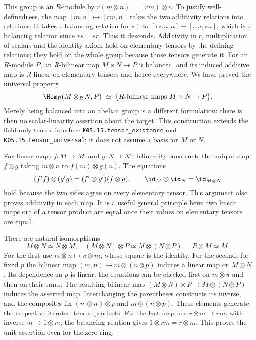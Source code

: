 This group is an $R$-module by $r(m\otimes n)=(rm)\otimes n$.
To justify well-definedness, the map $[m,n]\mapsto[rm,n]$ takes the two
additivity relations into relations. It takes a balancing relation for
$s$ into
$[rsm,n]-[rm,sn]$, which is a balancing relation since $rs=sr$.
Thus it descends. Additivity in $r$, multiplication of scalars and the
identity axiom hold on elementary tensors by the defining relations;
they hold on the whole group because those tensors generate it.
For an $R$-module $P$, an $R$-bilinear map $M\times N\to P$ is balanced,
and its induced additive map is $R$-linear on elementary tensors and hence
everywhere. We have proved the universal property
\[
 \Hom_R(M\otimes_RN,P)\ \simeq\
 \{\text{$R$-bilinear maps }M\times N\to P\}.
\]
Merely being balanced into an abelian group is a different formulation:
there is then no scalar-linearity assertion about the target.
This construction extends the field-only tensor interface
\texttt{K05.15.tensor\_existence} and
\texttt{K05.15.tensor\_universal}; it does not assume a basis for $M$ or $N$.

For linear maps $f:M\to M'$ and $g:N\to N'$, bilinearity constructs the
unique map $f\otimes g$ taking $m\otimes n$ to $f(m)\otimes g(n)$.
The equations
\[
 (f'f)\otimes(g'g)=(f'\otimes g')(f\otimes g),\qquad
 \id_M\otimes\id_N=\id_{M\otimes N}
\]
hold because the two sides agree on every elementary tensor.
This argument also proves additivity in each map.
It is a useful general principle here: two linear maps out of a tensor
product are equal once their values on elementary tensors are equal.

There are natural isomorphisms
\[
 M\otimes N\simeq N\otimes M,\quad
 (M\otimes N)\otimes P\simeq M\otimes(N\otimes P),\quad
 R\otimes M\simeq M.
\]
For the first use $m\otimes n\mapsto n\otimes m$, whose square is the
identity. For the second, for fixed $p$ the bilinear map
$(m,n)\mapsto m\otimes(n\otimes p)$ induces a linear map on $M\otimes N$.
Its dependence on $p$ is linear: the equations can be checked first on
$m\otimes n$ and then on their sums. The resulting bilinear map
$(M\otimes N)\times P\to M\otimes(N\otimes P)$ induces the asserted map.
Interchanging the parentheses constructs its inverse, and the
composites fix $(m\otimes n)\otimes p$ and $m\otimes(n\otimes p)$.
These elements generate the respective iterated tensor products.
For the last map use $r\otimes m\mapsto rm$, with inverse $m\mapsto1\otimes m$;
the balancing relation gives $1\otimes rm=r\otimes m$.
This proves the unit assertion even for the zero ring.


